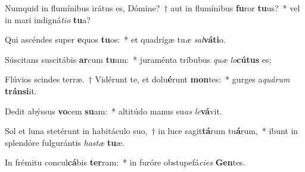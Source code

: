 \item Numquid in flumínibus irátus es, Dómine?~† aut in flumínibus \textbf{fu}ror \textbf{tu}us?~* vel in mari indigná\textit{ti}\textit{o} \textbf{tu}a?
\item Qui ascéndes super \textbf{e}quos \textbf{tu}os:~* et quadrígæ tu\textit{æ} \textit{sal}\textbf{vá}\textbf{ti}o.
\item Súscitans suscitábis \textbf{ar}cum \textbf{tu}um:~* juraménta tríbubus \textit{quæ} \textit{lo}\textbf{cú}\textbf{tus} es;
\item Flúvios scindes terræ.~† Vidérunt te, et dolu\textbf{é}runt \textbf{mon}tes:~* gurges a\textit{quá}\textit{rum} \textbf{tráns}\textbf{i}it.
\item Dedit abýssus \textbf{vo}cem \textbf{su}am:~* altitúdo manus su\textit{as} \textit{le}\textbf{vá}vit.
\item Sol et luna stetérunt in habitáculo suo,~† in luce sagit\textbf{tá}rum tu\textbf{á}rum,~* ibunt in splendóre fulgurántis \textit{has}\textit{tæ} \textbf{tu}æ.
\item In frémitu concul\textbf{cá}bis \textbf{ter}ram:~* in furóre obstupefá\textit{ci}\textit{es} \textbf{Gen}tes.
